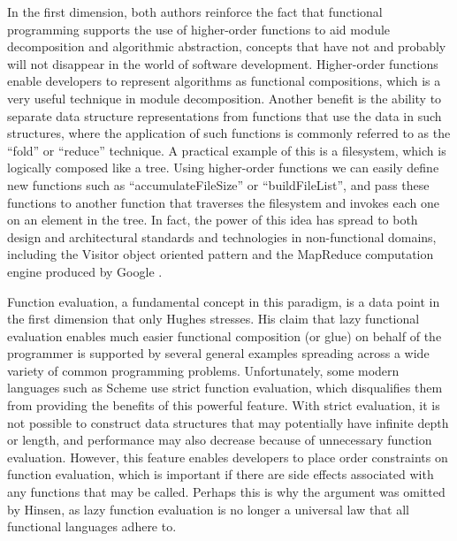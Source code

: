 \documentclass[12pt,letterpaper]{article}
\begin{document}
In the first dimension, 
both authors reinforce the fact that functional programming supports the use of higher-order functions to aid module
decomposition and algorithmic abstraction, concepts that have not and probably will not disappear in the world of 
software development. Higher-order functions enable developers to represent algorithms as functional compositions, which is a very useful technique in module decomposition. Another benefit is the ability to separate data structure representations from functions that use the data in such structures, where the application of such functions is commonly referred to as the ``fold'' or ``reduce'' technique. A
practical example of this is a filesystem, which is logically composed like a tree. Using higher-order functions we can easily 
define new functions such as ``accumulateFileSize'' or ``buildFileList'', and pass these functions to another function that 
traverses the filesystem and invokes each one on an element in the tree. In fact, the power of this idea has spread to both
design and architectural standards and technologies in non-functional domains, including the Visitor 
object oriented pattern \cite{Visitor} and the MapReduce computation engine produced by Google \cite{MapReduce}.

Function evaluation, a fundamental concept in this paradigm, is a data point in the first dimension that only Hughes stresses. His claim that lazy functional evaluation enables much easier functional composition (or glue) on behalf of the 
programmer is supported by several general examples spreading across a wide variety of common programming problems. Unfortunately, some modern languages such as Scheme use strict function evaluation, which disqualifies them from providing 
the benefits of this powerful feature. With strict evaluation, it is not possible to construct data structures that may potentially have infinite depth or length, and performance may also decrease because of unnecessary function evaluation. However, this feature enables developers to place order constraints on function evaluation, which is important if there are side effects associated with any functions that may be called. Perhaps this is why the argument was omitted by Hinsen, as lazy function evaluation is no longer a universal law that all functional languages adhere to. 
\end{document}
